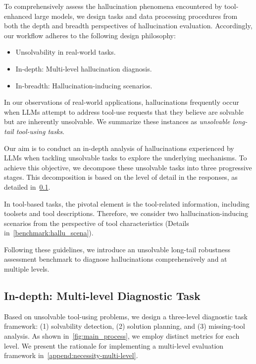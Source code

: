 \documentclass[11pt]{article}
\begin{document}
To comprehensively assess the hallucination phenomena encountered by tool-enhanced large models, we design tasks and data processing procedures from both the depth and breadth perspectives of hallucination evaluation. 
Accordingly, our workflow adheres to the following design philosophy:
\begin{itemize}
\setlength{\itemsep}{1pt}
\setlength{\parskip}{2pt}
\setlength{\parsep}{0pt}
\item Unsolvability in real-world tasks.
\item In-depth: Multi-level hallucination diagnosis.
\item In-breadth: Hallucination-inducing scenarios.
\end{itemize}

In our observations of real-world applications, hallucinations frequently occur when LLMs attempt to address tool-use requests that they believe are solvable but are inherently unsolvable. 
We summarize these instances as \textit{unsolvable long-tail tool-using tasks}.

Our aim is to conduct an in-depth analysis of hallucinations experienced by LLMs when tackling unsolvable tasks to explore the underlying mechanisms. 
To achieve this objective, we decompose these unsolvable tasks into three progressive stages. 
This decomposition is based on the level of detail in the responses, as detailed in~\cref{ss:multi-level-evaluation}.


In tool-based tasks, the pivotal element is the tool-related information, including toolsets and tool descriptions. 
Therefore, we consider two hallucination-inducing scenarios from the perspective of tool characteristics (Details in~\cref{benchmark:hallu_scena}).

Following these guidelines, we introduce an unsolvable long-tail robustness assessment benchmark to diagnose hallucinations comprehensively and at multiple levels.

\subsection{In-depth: Multi-level Diagnostic Task}
\label{ss:multi-level-evaluation}

Based on unsolvable tool-using problems, we design a three-level diagnostic task framework: (1) solvability detection, (2) solution planning, and (3) missing-tool analysis.
As shown in~\cref{fig:main_process}, we employ distinct metrics for each level.  We present the rationale for implementing a multi-level evaluation framework in~\cref{append:necessity-multi-level}.
\end{document}
